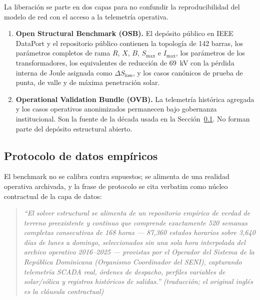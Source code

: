 La liberación se parte en dos capas para no confundir la reproducibilidad del modelo de red con el acceso a la telemetría operativa.
\begin{enumerate}
\item \textbf{Open Structural Benchmark (OSB).} El depósito público en IEEE DataPort y el repositorio público contienen la topología de 142 barras, los parámetros completos de rama $R$, $X$, $B$, $S_{\max}$ e $I_{\max}$, los parámetros de los transformadores, los equivalentes de reducción de 69~kV con la pérdida interna de Joule asignada como $\Delta S_{\mathrm{loss}}$, y los casos canónicos de prueba de punta, de valle y de máxima penetración solar.
\item \textbf{Operational Validation Bundle (OVB).} La telemetría histórica agregada y los casos operativos anonimizados permanecen bajo gobernanza institucional. Son la fuente de la década usada en la Sección~\ref{sub:dataprotocol}. No forman parte del depósito estructural abierto.
\end{enumerate}

\subsection{Protocolo de datos empíricos}
\label{sub:dataprotocol}

El benchmark no se calibra contra supuestos; se alimenta de una realidad operativa archivada, y la frase de protocolo se cita verbatim como núcleo contractual de la capa de datos:
\begin{quote}
\itshape ``El solver estructural se alimenta de un repositorio empírico de verdad de terreno preexistente y continuo que comprende exactamente 520 semanas completas consecutivas de 168 horas --- 87,360 estados horarios sobre 3,640 días de lunes a domingo, seleccionados sin una sola hora interpolada del archivo operativo 2016--2025 --- provistas por el Operador del Sistema de la República Dominicana (Organismo Coordinador del SENI), capturando telemetría SCADA real, órdenes de despacho, perfiles variables de solar/eólica y registros históricos de salidas.'' (traducción; el original inglés es la cláusula contractual)
\end{quote}

